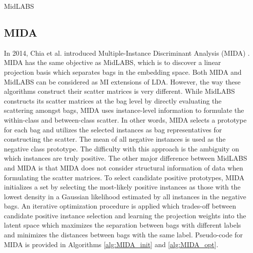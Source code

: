 \begin{algorithm}
	\caption{MidLABS}
	\label{alg:MidLABS}
	\begin{algorithmic}[1]
		\EndFor             
	\end{algorithmic}
\end{algorithm}


\subsection{MIDA}
In 2014, Chia et al. introduced Multiple-Instance Discriminant Analysis (MIDA) \citep{Chai2014MIDA}.  MIDA has the same objective as MidLABS, which is to discover a linear projection basis which separates bags in the embedding space.  Both MIDA and MidLABS  can be considered as MI extensions of LDA. However, the way these algorithms construct their scatter matrices is very different.  While MidLABS constructs its  scatter matrices at the bag level by directly evaluating the scattering amongst bags, MIDA  uses instance-level information to formulate the within-class and between-class scatter.  In other words, MIDA selects a prototype for each bag and utilizes the selected instances as bag representatives for constructing the scatter.  The mean of all negative instances is used as the negative class prototype. The difficulty with this approach is the ambiguity on which instances are truly positive.  The other major difference between MidLABS and MIDA is that MIDA does not consider structural information of data when formulating the scatter matrices. To select candidate positive prototypes, MIDA initializes a set by selecting the most-likely positive instances as those with the lowest density in a Gaussian likelihood estimated by all instances in the negative bags.  An iterative optimization procedure is applied which trades-off between candidate positive instance selection and learning the projection weights into the latent space which maximizes the separation between bags with different labels and minimizes the distances between bags with the same label.  Pseudo-code for MIDA  is provided in Algorithms \ref{alg:MIDA_init} and \ref{alg:MIDA_opt}.

